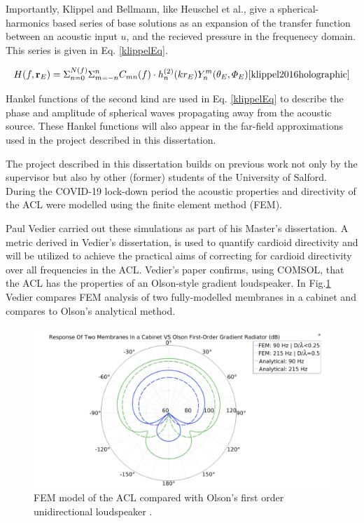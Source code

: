\documentclass{report}
\newcommand{\matr}[1]{\mathbf{#1}} %
\begin{document}
        Importantly, Klippel and Bellmann, like Heuschel et al., give a spherical-harmonics based series of base solutions as an expansion of the transfer function between an acoustic input $u$, and the recieved pressure in the frequenecy domain.
        This series is given in Eq. \ref{klippelEq}.

        \begin{equation}
            H(f,\matr{r}_E) = \Sigma_{n=0}^{N(f)}\Sigma_{m=-n}^{n}C_{mn}(f) \cdot h_n^{(2)}(kr_E)Y_n^m(\theta_E,\varPhi_E)\cite{klippel2016holographic}
            \label{klippelEq}
        \end{equation}

        Hankel functions of the second kind are used in Eq. \ref{klippelEq} to describe the phase and amplitude of spherical waves propagating away from the acoustic source.
        These Hankel functions will also appear in the far-field approximations used in the project described in this dissertation.

        The project described in this dissertation builds on previous work not only by the supervisor but also by other (former) students of the University of Salford.
        During the COVID-19 lock-down period the acoustic properties and directivity of the ACL were modelled using the finite element method (FEM).
        
        Paul Vedier carried out these simulations as part of his Master's dissertation.
        A metric derived in Vedier's dissertation, is used to quantify cardioid directivity and will be utilized to achieve the practical aims of correcting for cardioid directivity over all frequencies in the ACL.
        Vedier's paper confirms, using COMSOL, that the ACL has the properties of an Olson-style gradient loudspeaker.
        In Fig.\ref{vedierPolar} Vedier compares FEM analysis of two fully-modelled membranes in a cabinet and compares to Olson's analytical method.
        
        \begin{figure}[H]
            \centering
            \includegraphics[scale=0.6]{figs/vedierPolar.png}
            \caption{FEM model of the ACL compared with Olson's first order unidirectional loudspeaker \cite{vedier}.}
            \label{vedierPolar}
        \end{figure}
\end{document}
